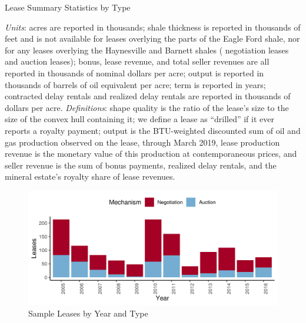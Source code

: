\documentclass[12pt]{article}
\newcommand{\inputy}[1]{\unskip}
\begin{document}
\addtolength{\tabcolsep}{-3pt}
\begin{table}[htbp]
\begin{center}
\begin{threeparttable}
	\caption{Lease Summary Statistics by Type}
	\label{tab:summary_stats}
 	\small
	
	\footnotesize
    \begin{tablenotes}
    \item \textit{Units}: acres are reported in thousands; shale thickness is reported in thousands of feet and is not available for leases overlying the parts of the Eagle Ford shale, nor for any leases overlying the Haynesville and Barnett shales (\inputy{../output/estimates/Nsample_NEGOTIATION_NOTHICK.tex} negotiation leases and \inputy{../output/estimates/Nsample_AUCTION_NOTHICK.tex} auction leases); bonus, lease revenue, and total seller revenues are all reported in thousands of nominal dollars per acre; output is reported in thousands of barrels of oil equivalent per acre; term is reported in years; contracted delay rentals and realized delay rentals are reported in thousands of dollars per acre.  \textit{Definitions}: shape quality is the ratio of the lease's size to the size of the convex hull containing it; we define a lease as ``drilled'' if it ever reports a royalty payment; output is the BTU-weighted discounted sum of oil and gas production observed on the lease, through March 2019, lease production revenue is the monetary value of this production at contemporaneous prices, and seller revenue is the sum of bonus payments, realized delay rentals, and the mineral estate's royalty share of lease revenues. 
    \end{tablenotes}
\end{threeparttable}
\end{center}
\end{table}
\addtolength{\tabcolsep}{3pt}


\begin{figure}[H]
    \centering
    \caption{Sample Leases by Year and Type}
	\label{fig:cohorts}
	\includegraphics[width=1\textwidth]{../output/figures/cohorts.png}
\end{figure}
\end{document}

